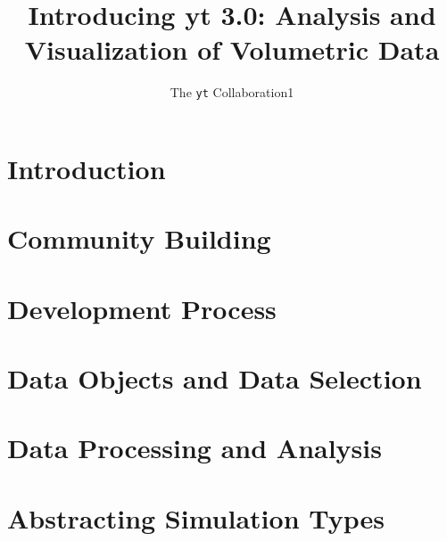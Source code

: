 \documentclass{emulateapj}
\newcommand{\yt}{\texttt{yt}}
\begin{document}
\title{Introducing yt 3.0: Analysis and Visualization of Volumetric Data}
\author{The \yt{} Collaboration{1}}
\email{}

\begin{abstract}
\end{abstract}

\keywords{}


\maketitle


\section{Introduction}


\section{Community Building}


\section{Development Process}


\section{Data Objects and Data Selection}


\section{Data Processing and Analysis}


\section{Abstracting Simulation Types}

\end{document}
